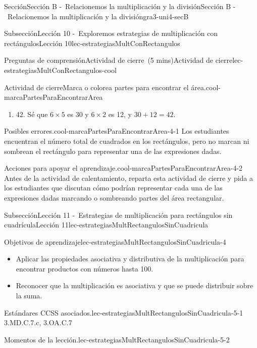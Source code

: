 \documentclass[oneside,10pt,]{article}
\begin{document}
\begin{sectionptx}{Sección}{Sección B -~Relacionemos la multiplicación y la división}{}{Sección B -~Relacionemos la multiplicación y la división}{}{}{gra3-uni4-secB}
\begin{subsectionptx}{Subsección}{Lección 10 -~Exploremos estrategias de multiplicación con rectángulos}{}{Lección 10}{}{}{lec-estrategiasMultConRectangulos}
\begin{reading-questions-subsubsection}{Preguntas de comprensión}{Actividad de cierre~(5 mins)}{}{Actividad de cierre}{}{}{lec-estrategiasMultConRectangulos-cool}
\begin{project}{Actividad de cierre}{Marca o colorea partes para encontrar el área.}{cool-marcaPartesParaEncontrarArea}
\begin{enumerate}[label={(\alph*)}]
\item{}42. Sé que \(6 \times 5\) es 30 y \(6 \times 2\) es 12, y \(30 + 12 = 42\).%
\end{enumerate}
\end{project}%
\par
\begin{paragraphs}{Posibles errores.}{cool-marcaPartesParaEncontrarArea-4-1}%
Los estudiantes encuentran el número total de cuadrados en los rectángulos, pero no marcan ni sombrean el rectángulo para representar una de las expresiones dadas.%
\end{paragraphs}%
\begin{paragraphs}{Acciones para apoyar el aprendizaje.}{cool-marcaPartesParaEncontrarArea-4-2}%
Antes de la actividad de calentamiento, reparta esta actividad de cierre y pida a los estudiantes que discutan cómo podrían representar cada una de las expresiones dadas marcando o sombreando partes del área rectangular.%
\end{paragraphs}%
\end{reading-questions-subsubsection}
\end{subsectionptx}
%
%
\typeout{************************************************}
\typeout{************************************************}
%
\begin{subsectionptx}{Subsección}{Lección 11 -~Estrategias de multiplicación para rectángulos sin cuadrícula}{}{Lección 11}{}{}{lec-estrategiasMultRectangulosSinCuadricula}
\begin{objectives}{Objetivos de aprendizaje}{lec-estrategiasMultRectangulosSinCuadricula-4}
%
\begin{itemize}[label=\textbullet]
\item{}Aplicar las propiedades asociativa y distributiva de la multiplicación para encontrar productos con números hasta 100.%
\item{}Reconocer que la multiplicación es asociativa y que se puede distribuir sobre la suma.%
\end{itemize}
\end{objectives}
\begin{introduction}{}%
\begin{paragraphs}{Estándares CCSS asociados.}{lec-estrategiasMultRectangulosSinCuadricula-5-1}%
3.MD.C.7.c, 3.OA.C.7%
\end{paragraphs}%
\begin{paragraphs}{Momentos de la lección.}{lec-estrategiasMultRectangulosSinCuadricula-5-2}%

\end{paragraphs}
\end{introduction}
\end{subsectionptx}
\end{sectionptx}
\end{document}
